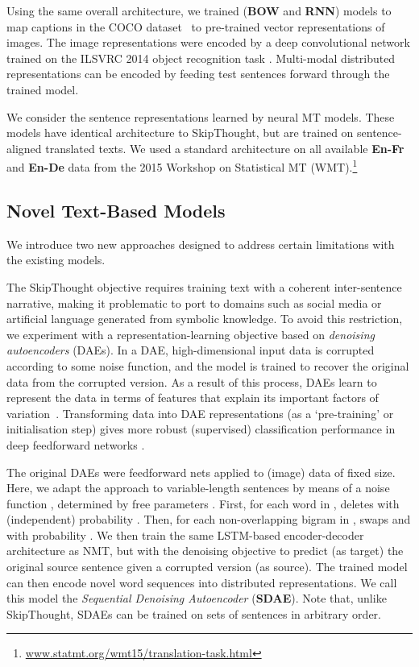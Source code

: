 \documentclass[11pt,letterpaper]{article}
\begin{document}
\vspace{5pt} Using the same overall architecture, we trained ({\bf BOW} and {\bf RNN}) models to map captions in the COCO dataset~\cite{chen2015microsoft} to pre-trained vector representations of images. The image representations were encoded by a deep convolutional network \cite{szegedy2014going} trained on the ILSVRC 2014 object recognition task \cite{russakovsky2014imagenet}. Multi-modal distributed representations can be encoded by feeding test sentences forward through the trained model. 

\vspace{5pt} We consider the sentence representations learned by neural MT models. These models have identical architecture to SkipThought, but are trained on sentence-aligned translated texts. We used a standard architecture \cite{cho2014learning} on all available {\bf En-Fr} and {\bf En-De} data from the 2015 Workshop on Statistical MT (WMT).\footnote{\scriptsize \url{www.statmt.org/wmt15/translation-task.html}} 

\subsection{Novel Text-Based Models}
We introduce two new approaches designed to address certain limitations with the existing models.

\vspace{5pt} The SkipThought objective requires training text with a coherent inter-sentence narrative, making it problematic to port to domains such as social media or artificial language generated from symbolic knowledge. To avoid this restriction, we experiment with a representation-learning objective based on \emph{denoising autoencoders} (DAEs). In a DAE, high-dimensional input data is corrupted according to some noise function, and the model is trained to recover the original data from the corrupted version. As a result of this process, DAEs learn to represent the data in terms of features that explain its important factors of variation~\cite{vincent2008extracting}. Transforming data into DAE representations (as a `pre-training' or initialisation step) gives more robust (supervised) classification performance in deep feedforward networks \cite{vincent2010stacked}.

The original DAEs were feedforward nets applied to (image) data of fixed size. Here, we adapt the approach to variable-length sentences by means of a noise function , determined by free parameters . First, for each word  in ,  deletes  with (independent) probability . Then, for each non-overlapping bigram  in ,  swaps  and  with probability . We then train the same LSTM-based encoder-decoder architecture as NMT, but with the denoising objective to predict (as target) the original source sentence  given a corrupted version  (as source). The trained model can then encode novel word sequences into distributed representations. We call this model the \emph{Sequential Denoising Autoencoder} ({\bf SDAE}). Note that, unlike SkipThought, SDAEs can be trained on sets of sentences in arbitrary order.   
\end{document}
